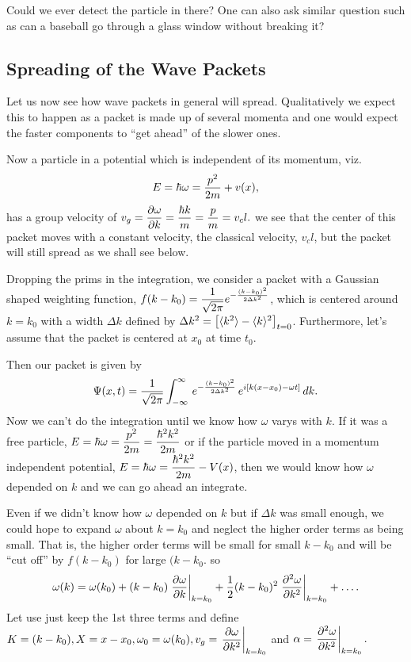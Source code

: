 Could we ever detect the particle in there? One can also ask similar question such as can a baseball go through a glass window without breaking it?

\subsection{Spreading of the Wave Packets}
Let us now see how wave packets in general will spread. Qualitatively we expect this to happen as a packet is made up of several momenta and one would expect the faster components to ``get ahead'' of the slower ones. 

Now a particle in a potential which is independent of its momentum, viz. $$E = \hbar\omega = {p^2\over2m} + v(x),$$ has a group velocity of $\displaystyle v_g = {\partial \omega\over \partial k} = {\hbar k \over m} = {p\over m} = v_cl.$
we see that the center of this packet moves with a constant velocity, the classical velocity, $v_cl$, but the packet will still spread as we shall see below.

Dropping the prims in the integration, we consider a packet with a Gaussian shaped weighting function, $\displaystyle f(k-k_0) ={1\over\sqrt{2\pi}}e^{-{(k-k_0)^2\over 2 \Delta k^2}}$, which is centered around $k = k_0$ with a width $\Delta k$ defined by $\Delta k^2 = \left[ \langle k^2\rangle - \langle k\rangle^2\right]_{t=0}$. Furthermore, let's assume that the packet is centered at $x_0$ at time $t_0$.

Then our packet is given by 
$$\Psi(x,t) = {1\over\sqrt{2\pi} } \int_{-\infty}^\infty \, e^{-{( k-k_0)^2\over2\Delta k^2}}\, e^{i[k(x-x_0) - \omega t]}\, dk.$$
Now we can't do the integration until we know how $\omega$ varys with $k$. If it was a free particle, $\displaystyle E = \hbar\omega = {p^2\over2m} = {\hbar^2k^2\over2m}$ or if the particle moved
in a momentum independent potential, $\displaystyle E = \hbar\omega = {\hbar^2k^2\over2m} - V(x)$, then we would know how $\omega$ depended on $k$ and we can go ahead an integrate. 

Even if we didn't know how $\omega$ depended on $k$ but if $\Delta k$ was small enough, we could hope to expand $\omega$ about $k = k_0$ and neglect the higher order terms as being
small. That is, the higher order terms will be small for small $k-k_0$ and will be ``cut off'' by $f(k-k_0)$ for large $(k-k_0$. so 
$$\omega(k) = \omega(k_0) + (k-k_0) \left.{\partial\omega\over\partial k}\right|_{k=k_0} + {1\over2}(k-k_0)^2\left.{\partial^2\omega\over\partial k^2}\right|_{k=k_0} + \hdots.$$
Let use just keep the 1st three terms and define $\displaystyle K = (k-k_0), X = x-x_0, \omega_0 = \omega(k_0), v_g =\left.{\partial\omega\over\partial k^2}\right|_{k=k_0}$ and
$\displaystyle \alpha = \left.{\partial^2\omega\over\partial k^2}\right|_{k=k_0}.$

